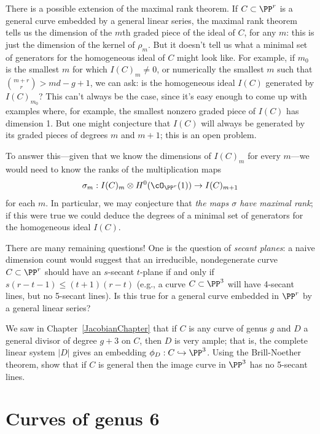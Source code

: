 There is a possible extension of the maximal rank theorem. If $C \subset \PP^r$ is a general curve embedded by a general linear series, the maximal rank theorem tells us the dimension of the $m$th graded piece of the ideal of $C$, for any $m$: this is just the dimension of the kernel of $\rho_m$. But it doesn't tell us what a minimal set of generators for the homogeneous ideal of $C$ might look like. For example, if $m_0$ is the smallest $m$ for which $I(C)_m \neq 0$, or numerically the smallest $m$ such that $\binom{m+r}{r} > md-g+1$, we can ask: is the homogeneous ideal $I(C)$ generated by $I(C)_{m_0}$? This can't always be the case, since it's easy enough to come up with examples where, for example, the  smallest nonzero graded piece of $I(C)$ has dimension 1. But one might conjecture that $I(C)$ will always be generated by its graded pieces of degrees $m$ and $m+1$; this is an open problem.

To answer this---given that we know the dimensions of $I(C)_m$ for every $m$---we would need to know the ranks of the multiplication maps
$$
\sigma_m : I(C)_m \otimes H^0(\cO_{\PP^r}(1)) \to I(C)_{m+1}
$$
for each $m$. In particular, we may conjecture that \emph{the maps $\sigma$ have maximal rank}; if this were true we could deduce the degrees of a minimal set of generators for the homogeneous ideal $I(C)$.


There are many remaining questions! One is the question of \emph{secant planes}: a naive dimension count would suggest that an irreducible, nondegenerate curve $C \subset \PP^r$ should have an $s$-secant $t$-plane if and only if $s(r-t-1) \leq (t+1)(r-t)$
(e.g., a curve $C \subset \PP^3$ will have 4-secant lines, but no 5-secant lines). Is this true for a general curve embedded in $\PP^r$ by a general linear series?

\begin{exercise}
We saw in Chapter~\ref{JacobianChapter} that if $C$ is any curve of genus $g$ and $D$ a general divisor of degree $g+3$ on $C$, then $D$ is very ample; that is, the complete linear system $|D|$ gives an embedding $\phi_D : C \hookrightarrow \PP^3$. Using the Brill-Noether theorem, show that if $C$ is general then the image curve in $\PP^3$ has no 5-secant lines.
\end{exercise}

\section{Curves of genus 6}\label{genus 6 section}


